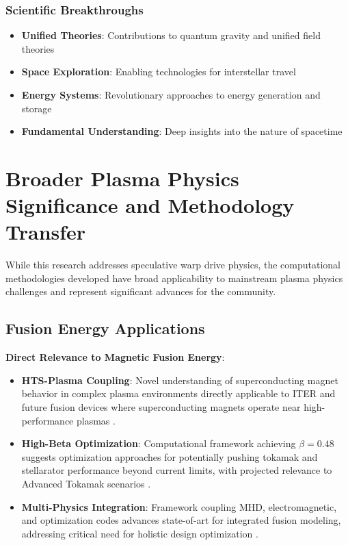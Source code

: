 \documentclass[12pt,a4paper]{article}
\begin{document}
\subsubsection{Scientific Breakthroughs}
\begin{itemize}
\item \textbf{Unified Theories}: Contributions to quantum gravity and unified field theories
\item \textbf{Space Exploration}: Enabling technologies for interstellar travel
\item \textbf{Energy Systems}: Revolutionary approaches to energy generation and storage
\item \textbf{Fundamental Understanding}: Deep insights into the nature of spacetime
\end{itemize}

\section{Broader Plasma Physics Significance and Methodology Transfer}

While this research addresses speculative warp drive physics, the computational methodologies developed have broad applicability to mainstream plasma physics challenges and represent significant advances for the community.

\subsection{Fusion Energy Applications}

\textbf{Direct Relevance to Magnetic Fusion Energy}:
\begin{itemize}
\item \textbf{HTS-Plasma Coupling}: Novel understanding of superconducting magnet behavior in complex plasma environments directly applicable to ITER and future fusion devices where superconducting magnets operate near high-performance plasmas \cite{HTS2024,MagneticConfinement2021}.
\item \textbf{High-Beta Optimization}: Computational framework achieving $\beta = 0.48$ suggests optimization approaches for potentially pushing tokamak and stellarator performance beyond current limits, with projected relevance to Advanced Tokamak scenarios \cite{Plasma2023}.
\item \textbf{Multi-Physics Integration}: Framework coupling MHD, electromagnetic, and optimization codes advances state-of-art for integrated fusion modeling, addressing critical need for holistic design optimization \cite{PlasmaPhysics2023}.
\end{itemize}
\end{document}
